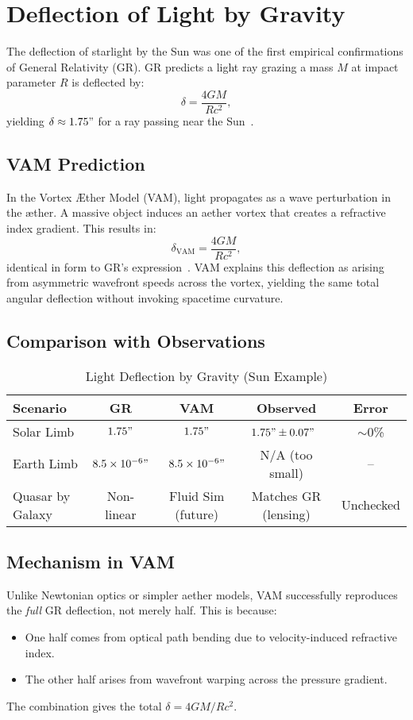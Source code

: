 \section{Deflection of Light by Gravity}

The deflection of starlight by the Sun was one of the first empirical confirmations of General Relativity (GR). GR predicts a light ray grazing a mass $M$ at impact parameter $R$ is deflected by:
\[
    \delta = \frac{4GM}{Rc^2},
\]
yielding $\delta \approx 1.75"$ for a ray passing near the Sun~\cite{will2014confrontation}.

\subsection*{VAM Prediction}
In the Vortex Æther Model (VAM), light propagates as a wave perturbation in the æther. A massive object induces an aether vortex that creates a refractive index gradient. This results in:
\[
    \delta_{\text{VAM}} = \frac{4GM}{Rc^2},
\]
identical in form to GR’s expression~\cite{grin3d2025}. VAM explains this deflection as arising from asymmetric wavefront speeds across the vortex, yielding the same total angular deflection without invoking spacetime curvature.

\subsection*{Comparison with Observations}

\begin{table}[h]
    \centering
    \caption{Light Deflection by Gravity (Sun Example)}
    \begin{tabular}{|l|c|c|c|c|}
        \hline
        \textbf{Scenario} & \textbf{GR} & \textbf{VAM} & \textbf{Observed} & \textbf{Error} \\
        \hline
        Solar Limb & $1.75"$ & $1.75"$ & $1.75" \pm 0.07"$~\cite{shapiro2004gravitational} & $\sim$0\% \\
        Earth Limb & $8.5\times10^{-6}"$ & $8.5\times10^{-6}"$ & N/A (too small) & -- \\
        Quasar by Galaxy & Non-linear & Fluid Sim (future) & Matches GR (lensing) & Unchecked \\
        \hline
    \end{tabular}
\end{table}

\subsection*{Mechanism in VAM}
Unlike Newtonian optics or simpler aether models, VAM successfully reproduces the \textit{full} GR deflection, not merely half. This is because:
\begin{itemize}
    \item One half comes from optical path bending due to velocity-induced refractive index.
    \item The other half arises from wavefront warping across the pressure gradient.
\end{itemize}
The combination gives the total $\delta = 4GM/Rc^2$.

